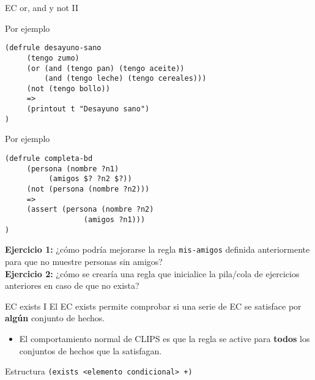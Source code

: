 \documentclass[usenames,dvipsnames,aspectratio=169]{beamer}
\begin{document}
\begin{frame}[fragile]{EC or, and y not II}
	\small
	\begin{minipage}{.48\textwidth}
		\begin{exampleblock}{Por ejemplo}
			\footnotesize
			\begin{verbatim}
(defrule desayuno-sano
     (tengo zumo)
     (or (and (tengo pan) (tengo aceite))
         (and (tengo leche) (tengo cereales)))
     (not (tengo bollo))
     =>
     (printout t "Desayuno sano")
)
			\end{verbatim}
		\end{exampleblock}
	\end{minipage}
	\hfill
	\begin{minipage}{.48\textwidth}
		\begin{exampleblock}{Por ejemplo}
			\footnotesize
			\begin{verbatim}
(defrule completa-bd
     (persona (nombre ?n1)
          (amigos $? ?n2 $?))
     (not (persona (nombre ?n2)))
     =>
     (assert (persona (nombre ?n2)
                  (amigos ?n1)))
)
			\end{verbatim}
		\end{exampleblock}
	\end{minipage}
	\textbf{Ejercicio 1:} ¿cómo podría mejorarse la regla \texttt{mis-amigos} definida anteriormente para que no muestre personas sin amigos?\\
	\textbf{Ejercicio 2:} ¿cómo se crearía una regla que inicialice la pila/cola de ejercicios anteriores en caso de que no exista?
\end{frame}

\begin{frame}{EC exists I}
	El EC exists permite comprobar si una serie de EC se satisface por \textbf{algún} conjunto de hechos.
	\begin{itemize}
		\item El comportamiento normal de CLIPS es que la regla se active para \textbf{todos} los conjuntos de hechos que la satisfagan.
	\end{itemize}
	\begin{block}{Estructura}
		\texttt{(exists <elemento condicional> +)}\\
	\end{block}
\end{frame}
\end{document}
